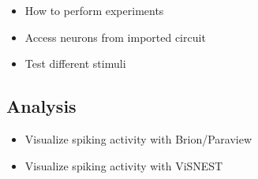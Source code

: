 \begin{itemize}
	  \item How to perform experiments
      \item Access neurons from imported circuit
      \item Test different stimuli 
\end{itemize}

\subsection{Analysis}
\begin{itemize}
	  \item Visualize spiking activity with Brion/Paraview
      \item Visualize spiking activity with ViSNEST
\end{itemize}